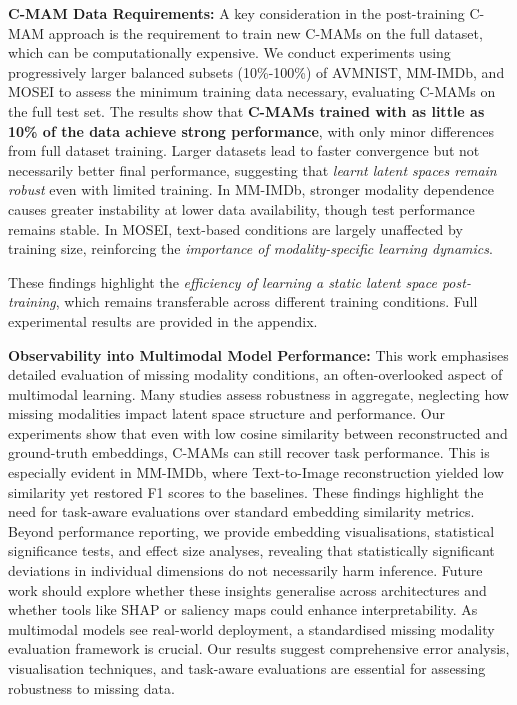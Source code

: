\textbf{C-MAM Data Requirements:} A key consideration in the post-training C-MAM approach is the requirement to train new C-MAMs on the full dataset, which can be computationally expensive. We conduct experiments using progressively larger balanced subsets (10\%-100\%) of AVMNIST, MM-IMDb, and MOSEI to assess the minimum training data necessary, evaluating C-MAMs on the full test set. The results show that \textbf{C-MAMs trained with as little as 10\% of the data achieve strong performance}, with only minor differences from full dataset training. Larger datasets lead to faster convergence but not necessarily better final performance, suggesting that \textit{learnt latent spaces remain robust} even with limited training. In MM-IMDb, stronger modality dependence causes greater instability at lower data availability, though test performance remains stable. In MOSEI, text-based conditions are largely unaffected by training size, reinforcing the \textit{importance of modality-specific learning dynamics}.

These findings highlight the \textit{efficiency of learning a static latent space post-training}, which remains transferable across different training conditions. Full experimental results are provided in the appendix.

\textbf{Observability into Multimodal Model Performance:} This work emphasises detailed evaluation of missing modality conditions, an often-overlooked aspect of multimodal learning. Many studies assess robustness in aggregate, neglecting how missing modalities impact latent space structure and performance. Our experiments show that even with low cosine similarity between reconstructed and ground-truth embeddings, C-MAMs can still recover task performance. This is especially evident in MM-IMDb, where Text-to-Image reconstruction yielded low similarity yet restored F1 scores to the baselines. These findings highlight the need for task-aware evaluations over standard embedding similarity metrics. Beyond performance reporting, we provide embedding visualisations, statistical significance tests, and effect size analyses, revealing that statistically significant deviations in individual dimensions do not necessarily harm inference. Future work should explore whether these insights generalise across architectures and whether tools like SHAP or saliency maps could enhance interpretability. As multimodal models see real-world deployment, a standardised missing modality evaluation framework is crucial. Our results suggest comprehensive error analysis, visualisation techniques, and task-aware evaluations are essential for assessing robustness to missing data.


